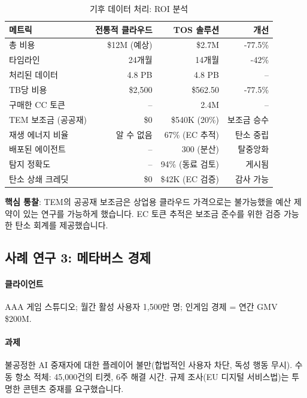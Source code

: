\documentclass[11pt]{article}
\begin{document}
\begin{table}[H]
\centering
\caption{기후 데이터 처리: ROI 분석}
\label{tab:climate-roi}
\begin{tabular}{@{}lrrr@{}}
\toprule
\textbf{메트릭} & \textbf{전통적 클라우드} & \textbf{TOS 솔루션} & \textbf{개선} \\ \midrule
총 비용 & \$12M (예상) & \$2.7M & -77.5\% \\
타임라인 & 24개월 & 14개월 & -42\% \\
처리된 데이터 & 4.8 PB & 4.8 PB & -- \\
TB당 비용 & \$2,500 & \$562.50 & -77.5\% \\
구매한 CC 토큰 & -- & 2.4M & -- \\
TEM 보조금 (공공재) & \$0 & \$540K (20\%) & 보조금 승수 \\
재생 에너지 비율 & 알 수 없음 & 67\% (EC 추적) & 탄소 중립 \\
배포된 에이전트 & -- & 300 (분산) & 탈중앙화 \\
탐지 정확도 & -- & 94\% (동료 검토) & 게시됨 \\
탄소 상쇄 크레딧 & \$0 & \$42K (EC 검증) & 감사 가능 \\
\bottomrule
\end{tabular}
\end{table}

\textbf{핵심 통찰}: TEM의 공공재 보조금은 상업용 클라우드 가격으로는 불가능했을 예산 제약이 있는 연구를 가능하게 했습니다. EC 토큰 추적은 보조금 준수를 위한 검증 가능한 탄소 회계를 제공했습니다.

\subsection{사례 연구 3: 메타버스 경제}

\paragraph{클라이언트} AAA 게임 스튜디오; 월간 활성 사용자 1,500만 명; 인게임 경제 = 연간 GMV \$200M.

\paragraph{과제} 불공정한 AI 중재자에 대한 플레이어 불만(합법적인 사용자 차단, 독성 행동 무시). 수동 항소 적체: 45,000건의 티켓, 6주 해결 시간. 규제 조사(EU 디지털 서비스법)는 투명한 콘텐츠 중재를 요구했습니다.
\end{document}
